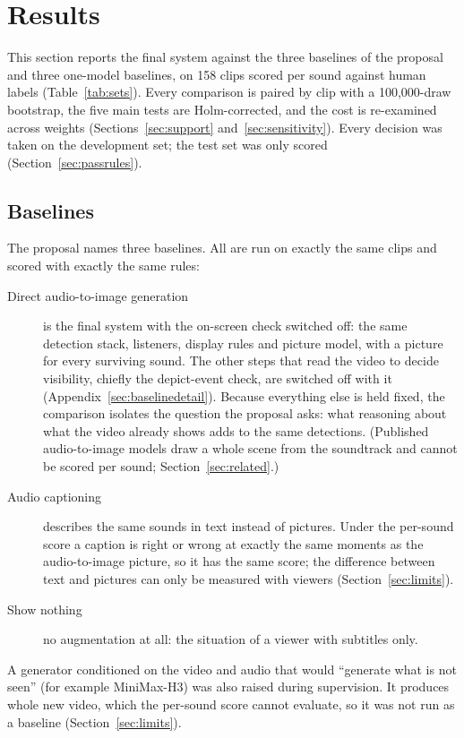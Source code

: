 \section{Results}\label{sec:results}
This section reports the final system against the three baselines of the proposal and three one-model baselines, on
158 clips scored per sound against human labels (Table~\ref{tab:sets}). Every comparison is paired by clip with a
100{,}000-draw bootstrap, the five main tests are Holm-corrected, and the cost is re-examined across weights
(Sections~\ref{sec:support} and~\ref{sec:sensitivity}). Every decision was taken on the development set; the test set
was only scored (Section~\ref{sec:passrules}).

\subsection{Baselines}\label{sec:baselines}
The proposal names three baselines. All are run on exactly the same clips and scored with exactly the same rules:
\begin{description}
  \item[Direct audio-to-image generation] is the final system with the on-screen check switched off: the same
        detection stack, listeners, display rules and picture model, with a picture for every surviving sound. The
        other steps that read the video to decide visibility, chiefly the depict-event check, are switched off with
        it (Appendix~\ref{sec:baselinedetail}). Because everything else is held fixed, the comparison isolates the
        question the proposal asks: what reasoning about what the video already shows adds to the same detections.
        (Published audio-to-image models draw a whole scene from the soundtrack and cannot be scored per sound;
        Section~\ref{sec:related}.)
  \item[Audio captioning] describes the same sounds in text instead of pictures. Under the per-sound score a caption is
        right or wrong at exactly the same moments as the audio-to-image picture, so it has the same score; the
        difference between text and pictures can only be measured with viewers (Section~\ref{sec:limits}).
  \item[Show nothing] no augmentation at all: the situation of a viewer with subtitles only.
\end{description}
A generator conditioned on the video and audio that would ``generate what is not seen'' (for example MiniMax-H3) was
also raised during supervision. It produces whole new video, which the per-sound score cannot evaluate, so it was not
run as a baseline (Section~\ref{sec:limits}).

